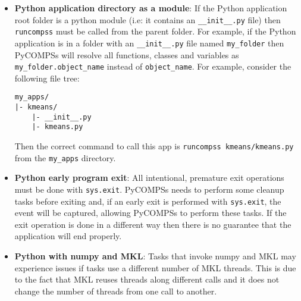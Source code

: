 \begin{itemize}
 \item \textbf{Python application directory as a module}:\newline
 If the Python application root folder is a python module (i.e: it contains an \verb|__init__.py| file) then \verb|runcompss| must be called from
 the parent folder. For example, if the Python application is in a folder with an \verb|__init__.py| file named \verb|my_folder| then PyCOMPSs will
 resolve all functions, classes and variables as \verb|my_folder.object_name| instead of \verb|object_name|. For example, consider the following file
 tree:
\begin{lstlisting}[]
my_apps/
|- kmeans/
    |- __init__.py
    |- kmeans.py
\end{lstlisting}
 Then the correct command to call this app is \verb|runcompss kmeans/kmeans.py| from the \verb|my_apps| directory.

 \item \textbf{Python early program exit}:\newline
 All intentional, premature exit operations must be done with \verb|sys.exit|. 
 PyCOMPSs needs to perform some cleanup tasks before exiting and, if an early exit is performed with \verb|sys.exit|, the event will be captured,
 allowing PyCOMPSs to perform these tasks. If the exit operation is done in a different way then there is no guarantee that the application will end properly.

 \item \textbf{Python with numpy and MKL}:\newline
 Tasks that invoke numpy and MKL may experience issues if tasks use a different number of MKL threads. This is due to the fact that MKL reuses 
 threads along different calls and it does not change the number of threads from one call to another.


\end{itemize}


